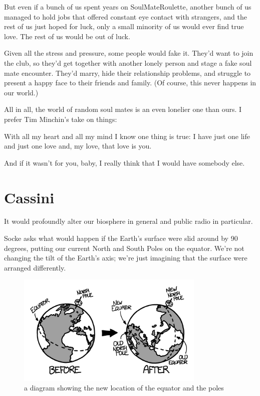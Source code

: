 {But even if a bunch of us spent years on SoulMateRoulette, another bunch of us managed to hold jobs that offered constant eye contact with strangers, and the rest of us just hoped for luck, only a small minority of us would ever find true love. The rest of us would be out of luck.}

{Given all the stress and pressure, some people would fake it. They’d want to join the club, so they’d get together with another lonely person and stage a fake soul mate encounter. They’d marry, hide their relationship problems, and struggle to present a happy face to their friends and family. (Of course, this never happens in our world.)}

{All in all, the world of random soul mates is an even lonelier one than ours. I prefer Tim Minchin’s take on things:}

{With all my heart and all my mind I know one thing is true:
I have just one life and just one love and, my love, that love is you.}

{And if it wasn't for you, baby,
I really think that I would
have somebody else.}

{
\chapter{Cassini}
}

\hfill{}

{It would profoundly alter our biosphere in general and public radio in particular.}

{Socke asks what would happen if the Earth’s surface were slid around by 90 degrees, putting our current North and South Poles on the equator. We’re not changing the tilt of the Earth’s axis; we’re just imagining that the surface were arranged differently.}

\begin{figure}[!htbp]
\centering
\includegraphics[scale=0.5, max width=0.8\textwidth]{imgs/a/10/cassini_flip.png}
\caption{a diagram showing the new location of the equator and the poles}
\end{figure}

